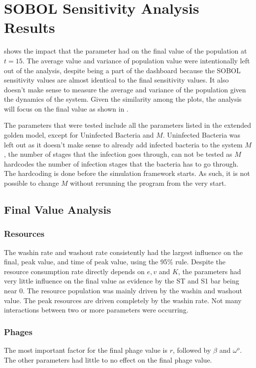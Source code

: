 \section{SOBOL Sensitivity Analysis Results}
\label{sec:SOBOL_sensitivity_analysis_results}

 shows the impact that the parameter had on the final value of the population at $t=15$. 
The average value and variance of population value were intentionally left out of the analysis, despite being a part of the dashboard because the SOBOL sensitivity values are almost identical to the final sensitivity values. 
It also doesn't make sense to measure the average and variance of the population given the dynamics of the system. 
Given the similarity among the plots, the analysis will focus on the final value as shown in .

The parameters that were tested include all the parameters listed in the extended golden model, except for Uninfected Bacteria and $M$. 
Uninfected Bacteria was left out as it doesn't make sense to already add infected bacteria to the system
$M$, the number of stages that the infection goes through, can not be tested as $M$ hardcodes the number of infection stages that the bacteria has to go through. 
The hardcoding is done before the simulation framework starts. 
As such, it is not possible to change $M$ without rerunning the program from the very start. 

\subsection{Final Value Analysis}
\subsubsection{Resources}
The washin rate and washout rate consistently had the largest influence on the final, peak value, and time of peak value, using the 95\% rule. 
Despite the resource consumption rate directly depends on $e, v$ and $K$, the parameters had very little influence on the final value as evidence by the ST and S1 bar being near 0. 
The resource population was mainly driven by the washin and washout value. 
The peak resources are driven completely by the washin rate. 
Not many interactions between two or more parameters were occurring. 

\subsubsection{Phages}
The most important factor for the final phage value is $r$, followed by $\beta$ and $\omega^o$. 
The other parameters had little to no effect on the final phage value. 

